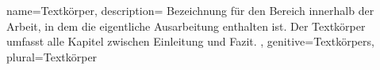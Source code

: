 

{
	name=Textkörper,
	description={
			Bezeichnung für den Bereich innerhalb der Arbeit, in dem die
			eigentliche Ausarbeitung enthalten ist. Der Textkörper umfasst
			alle Kapitel zwischen Einleitung und Fazit.
		},
	genitive=Textkörpers,
	plural=Textkörper
}




